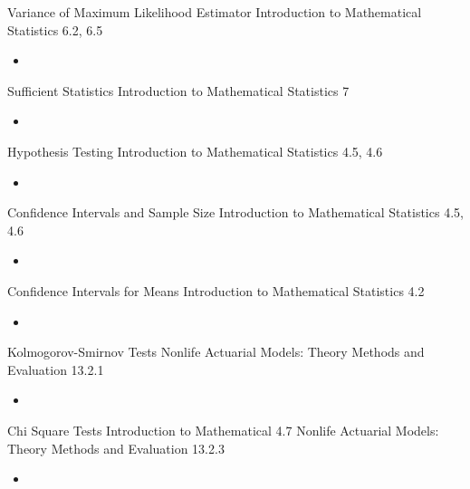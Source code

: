 \begin{CHPT_SUMM_AUTO_NUMB}[label = {L.-31}]{Variance of Maximum Likelihood Estimator}
Introduction to Mathematical Statistics 6.2, 6.5
	\begin{itemize}
		\item	
	\end{itemize}
\end{CHPT_SUMM_AUTO_NUMB}

\begin{CHPT_SUMM_AUTO_NUMB}[label = {L.-32}]{Sufficient Statistics}
Introduction to Mathematical Statistics 7
	\begin{itemize}
		\item	
	\end{itemize}
\end{CHPT_SUMM_AUTO_NUMB}

\begin{CHPT_SUMM_AUTO_NUMB}[label = {L.-33}]{Hypothesis Testing}
Introduction to Mathematical Statistics 4.5, 4.6
	\begin{itemize}
		\item	
	\end{itemize}
\end{CHPT_SUMM_AUTO_NUMB}

\begin{CHPT_SUMM_AUTO_NUMB}[label = {L.-34}]{Confidence Intervals and Sample Size}
Introduction to Mathematical Statistics 4.5, 4.6
	\begin{itemize}
		\item	
	\end{itemize}
\end{CHPT_SUMM_AUTO_NUMB}

\begin{CHPT_SUMM_AUTO_NUMB}[label = {L.-35}]{Confidence Intervals for Means}
Introduction to Mathematical Statistics 4.2
	\begin{itemize}
		\item	
	\end{itemize}
\end{CHPT_SUMM_AUTO_NUMB}

\begin{CHPT_SUMM_AUTO_NUMB}[label = {L.-36}]{Kolmogorov-Smirnov Tests}
Nonlife Actuarial Models: Theory Methods and Evaluation 13.2.1
	\begin{itemize}
		\item	
	\end{itemize}
\end{CHPT_SUMM_AUTO_NUMB}

\begin{CHPT_SUMM_AUTO_NUMB}[label = {L.-37}]{Chi Square Tests}
Introduction to Mathematical 4.7
Nonlife Actuarial Models: Theory Methods and Evaluation 13.2.3
	\begin{itemize}
		\item	
	\end{itemize}
\end{CHPT_SUMM_AUTO_NUMB}

